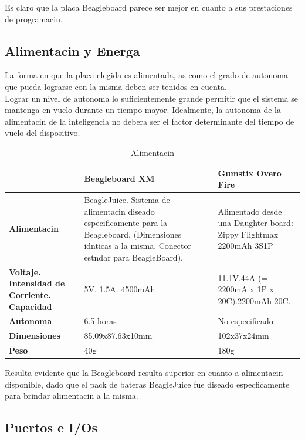 \documentclass[spanish,12pt,a4paper,titlepage]{report}
\begin{document}
Es claro que la placa Beagleboard parece ser mejor en cuanto a sus prestaciones de programacin.

\subsection*{Alimentacin y Energa}

La forma en que la placa elegida es alimentada, as como el grado de autonoma que pueda lograrse con la misma deben ser tenidos en cuenta.\\
Lograr un nivel de autonoma lo suficientemente grande permitir que el sistema se mantenga en vuelo durante un tiempo mayor. Idealmente, la autonoma de la alimentacin de la inteligencia no debera ser el factor determinante del tiempo de vuelo del dispositivo.

\begin{table}[H]
\begin{tabular}{p{130pt}|p{130pt}|p{130pt}|} 
\cline{2-3}
& \cellcolor[gray]{0.8} \textbf{Beagleboard XM} 
& \cellcolor[gray]{0.8} \textbf{Gumstix Overo Fire} \\ \cline{1-3} \hline
\multicolumn{1}{|p{130pt}|}{\cellcolor[gray]{0.8}\textbf{Alimentacin}} 
& BeagleJuice. Sistema de alimentacin diseado especificamente para la Beagleboard. (Dimensiones idnticas a la misma. Conector estndar para BeagleBoard).
& Alimentado desde una Daughter board: Zippy Flightmax 2200mAh 3S1P\\ 
\hline 
\multicolumn{1}{|p{130pt}|}{\cellcolor[gray]{0.8}\textbf{Voltaje. Intensidad de Corriente. Capacidad}} 
&5V. 1.5A. 4500mAh & 11.1V.44A (= 2200mA x 1P x 20C).2200mAh 20C.\\
\hline
\multicolumn{1}{|p{130pt}|}{\cellcolor[gray]{0.8}\textbf{Autonoma}} 
&6.5 horas &No especificado\\
\hline
\multicolumn{1}{|p{130pt}|}{\cellcolor[gray]{0.8}\textbf{Dimensiones}} 
&85.09x87.63x10mm &102x37x24mm\\
\hline
\multicolumn{1}{|p{130pt}|}{\cellcolor[gray]{0.8}\textbf{Peso}} 
&40g &180g\\
\hline
\end{tabular}
\caption{Alimentacin}
\label{tab:alimentacion}
\end{table}

Resulta evidente que la Beagleboard resulta superior en cuanto a alimentacin disponible, dado que el pack de bateras BeagleJuice fue diseado especficamente para brindar alimentacin a la misma.

\subsection*{Puertos e I/Os}
\end{document}
